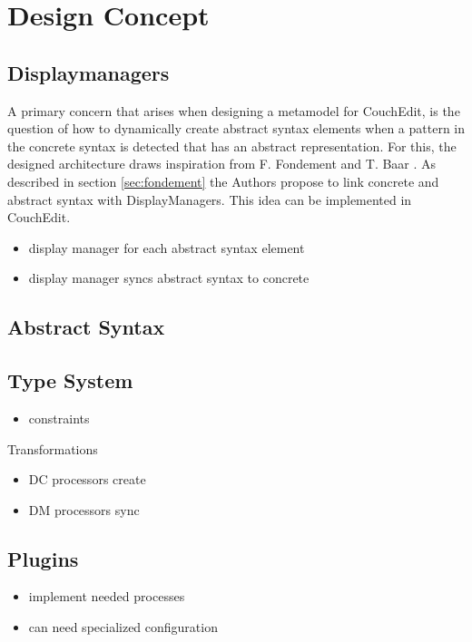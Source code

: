 \chapter{Design Concept}







\section{Displaymanagers}
A primary concern that arises when designing a metamodel for CouchEdit, is the question of how to dynamically create abstract syntax elements when a pattern in the concrete syntax is detected that has an abstract representation. For this, the designed architecture draws inspiration from F. Fondement and T. Baar \cite{fondement_making_2005}. As described in section \ref{sec:fondement} the Authors propose to link concrete and abstract syntax with DisplayManagers. This idea can be implemented in CouchEdit.
\begin{itemize}
  \item display manager for each abstract syntax element
  \item display manager syncs abstract syntax to concrete
\end{itemize}


\section{Abstract Syntax}

\section{Type System}
\begin{itemize}
  \item constraints
\end{itemize}

Transformations

\begin{itemize}
  \item DC processors create
  \item DM processors sync
\end{itemize}

\section{Plugins}
\begin{itemize}
  \item implement needed processes
  \item can need specialized configuration
\end{itemize}
